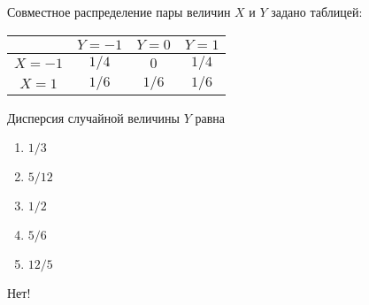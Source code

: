\documentclass[t]{beamer}
\begin{document}
 \begin{frame} \label{15-No} 
\begin{block}{15} 

Совместное распределение пары величин $X$ и $Y$ задано таблицей:

\begin{center}
	\begin{tabular}{@{}c|ccc@{}}
		\toprule
		& $Y=-1$ & $Y=0$ & $Y=1$ \\ \midrule
		$X=-1$ & $1/4$  & $0$   & $1/4$ \\
		$X=1$  & $1/6$  & $1/6$ & $1/6$ \\ \bottomrule
	\end{tabular}
\end{center}

\vspace{0.5cm} 
 
 
Дисперсия случайной величины $Y$  равна
 


 \end{block} 
\begin{enumerate} 
\item[] \hyperlink{15-No}{\beamergotobutton{} $1/3$}
\item[] \hyperlink{15-No}{\beamergotobutton{} $5/12$}
\item[] \hyperlink{15-No}{\beamergotobutton{} $1/2$}
\item[] \hyperlink{15-Yes}{\beamergotobutton{} $5/6$}
\item[] \hyperlink{15-No}{\beamergotobutton{} $12/5$
}
\end{enumerate} 

 \alert{Нет!} 
\end{frame} 
\end{document}
